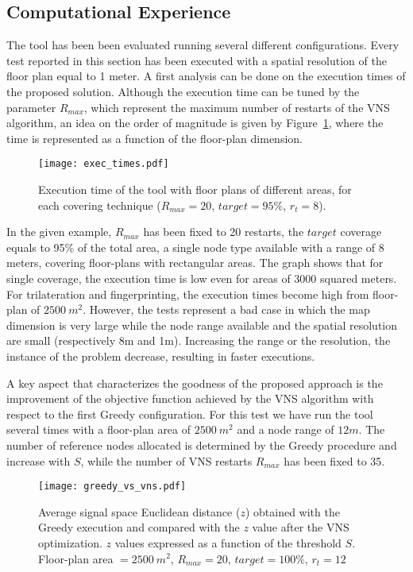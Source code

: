 \subsection{Computational Experience}\label{subsec:comp_res}
The tool has been been evaluated running several different configurations. Every test reported in this section has been executed with a spatial resolution of the floor plan equal to 1 meter.  A first analysis can be done on the execution times of the proposed solution. Although the execution time can be tuned by the parameter $R_{max}$, which represent the maximum number of restarts of the VNS algorithm, an idea on the order of magnitude is given by Figure~\ref{fig:time}, where the time is represented as a function of the floor-plan dimension.
\begin{figure}[h!tb]
\centering\texttt{[image: exec\_times.pdf]}
\caption{Execution time of the tool with floor plans of different areas, for each covering technique ($R_{max} = 20$, $target = 95\%$, $r_t=8$).}
\label{fig:time}
\end{figure}
In the given example, $R_{max}$ has been fixed to 20 restarts, the $target$ coverage equals to 95\% of the total area, a single node type available with a range of 8 meters, covering floor-plans with rectangular areas. The graph shows that for single coverage, the execution time is low even for areas of 3000 squared meters. For trilateration and fingerprinting, the execution times become high from floor-plan of $2500~m^2$. However, the tests represent a bad case in which the map dimension is very large while the node range available and the spatial resolution are small (respectively 8m and 1m). Increasing the range or the resolution, the instance of the problem decrease, resulting in faster executions.

A key aspect that characterizes the goodness of the proposed approach is the improvement of the objective function achieved by the VNS algorithm with respect to the first Greedy configuration. For this test we have run the tool several times with a floor-plan area of $2500~m^2$ and a node range of $12m$. The number of reference nodes allocated is determined by the Greedy procedure and increase with $S$, while the number of VNS restarts $R_{max}$ has been fixed to 35.

\begin{figure}[h!tb]
\centering\texttt{[image: greedy\_vs\_vns.pdf]}
\caption{Average signal space Euclidean distance ($z$) obtained with the Greedy execution and compared with the $z$ value after the VNS optimization. $z$ values expressed as a function of the threshold $S$. Floor-plan area $=2500~m^2$, $R_{max} = 20$, $target = 100\%$, $r_t=12$}
\label{fig:greedy_vns}
\end{figure}


